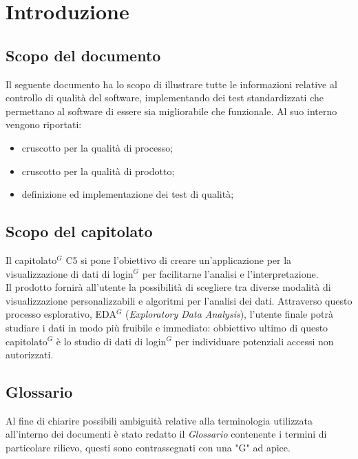 \section{Introduzione}

\subsection{Scopo del documento}

Il seguente documento ha lo scopo di illustrare tutte le informazioni relative al controllo di qualità del software, implementando dei test standardizzati che permettano al software di essere sia migliorabile che funzionale.
Al suo interno vengono riportati:
\begin{itemize}
    \item cruscotto per la qualità di processo;
    \item cruscotto per la qualità di prodotto;
    \item definizione ed implementazione dei test di qualità;
\end{itemize}

\subsection{Scopo del capitolato}
Il capitolato$^{G}$ C5 si pone l'obiettivo di creare un'applicazione per la visualizzazione di dati
di login$^{G}$ per facilitarne l'analisi e l'interpretazione.\\
Il prodotto fornirà all'utente la possibilità di scegliere tra diverse modalità di visualizzazione personalizzabili 
e algoritmi per l'analisi dei dati. Attraverso questo processo esplorativo, EDA$^{G}$ (\textit{Exploratory Data Analysis}), 
l'utente finale potrà studiare i dati in modo più fruibile e immediato: obbiettivo ultimo di questo capitolato$^{G}$ 
è lo studio di dati di login$^{G}$ per individuare potenziali accessi non autorizzati.

\subsection{Glossario}
Al fine di chiarire possibili ambiguità relative alla terminologia utilizzata all'interno dei
documenti è stato redatto il \textit{Glossario} contenente i termini di particolare rilievo, questi
sono contrassegnati con una "G" ad apice.
\newpage